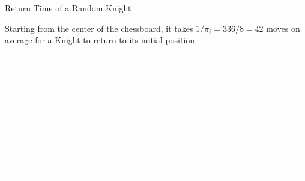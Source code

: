 \documentclass[letterpaper, mathserif]{beamer}
\begin{document}
\begin{frame}{Return Time of a Random Knight}
\begin{minipage}{0.7\linewidth}Starting from the center of the chessboard,
 it takes $1/\pi_i=336/8=42$ moves on average for a Knight to return to its initial position
 \end{minipage}
\begin{minipage}{0.28\linewidth}\tabcolsep=3pt
\begin{flushright}
\renewcommand{\arraystretch}{0.65}
\begin{tabular}{|c|c|c|c|c|c|c|c|}\hline
~ & ~ & ~ & ~ & ~ & ~ & ~ & ~ \\\hline
~ & ~ & ~ & ~ & ~ & ~ & ~ & ~ \\\hline
~ & ~ & \cellcolor{yellow}~ & \cellcolor{yellow}~ & \cellcolor{yellow}~ & \cellcolor{yellow}~ & ~ & ~ \\\hline
~ & ~ & \cellcolor{yellow}~ & \cellcolor{yellow}~ & \cellcolor{yellow}~ & \cellcolor{yellow}~ & ~ & ~ \\\hline
~ & ~ & \cellcolor{yellow}~ & \cellcolor{yellow}~ & \cellcolor{yellow}~ & \cellcolor{yellow}~ & ~ & ~ \\\hline
~ & ~ & \cellcolor{yellow}~ & \cellcolor{yellow}~ & \cellcolor{yellow}~ & \cellcolor{yellow}~ & ~ & ~ \\\hline
~ & ~ & ~ & ~ & ~ & ~ & ~ & ~ \\\hline
~ & ~ & ~ & ~ & ~ & ~ & ~ & ~\\\hline
\end{tabular}
\end{flushright}
\end{minipage}
\end{frame}
\end{document}
